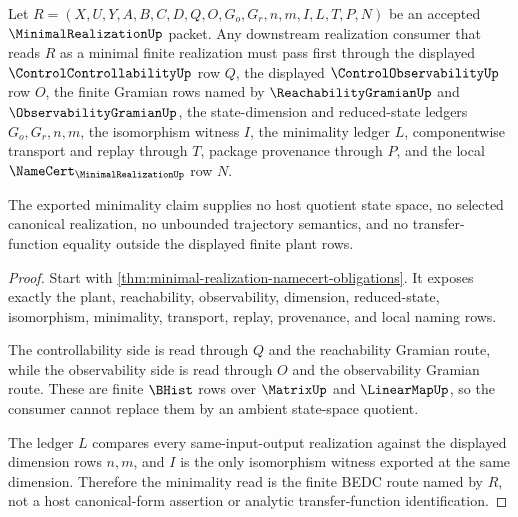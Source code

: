 \begin{theorem}
\label{thm:minimal-realization-controllability-observability-minimality}
Let $R=(X,U,Y,A,B,C,D,Q,O,G_o,G_r,n,m,I,L,T,P,N)$ be an accepted $\MinimalRealizationUp$ packet. Any downstream realization consumer that reads $R$ as a minimal finite realization must pass first through the displayed $\ControlControllabilityUp$ row $Q$, the displayed $\ControlObservabilityUp$ row $O$, the finite Gramian rows named by $\ReachabilityGramianUp$ and $\ObservabilityGramianUp$, the state-dimension and reduced-state ledgers $G_o,G_r,n,m$, the isomorphism witness $I$, the minimality ledger $L$, componentwise transport and replay through $T$, package provenance through $P$, and the local $\NameCert_{\MinimalRealizationUp}$ row $N$.

The exported minimality claim supplies no host quotient state space, no selected canonical realization, no unbounded trajectory semantics, and no transfer-function equality outside the displayed finite plant rows.
\end{theorem}
\begin{proof}
Start with \autoref{thm:minimal-realization-namecert-obligations}. It exposes exactly the plant, reachability, observability, dimension, reduced-state, isomorphism, minimality, transport, replay, provenance, and local naming rows.

The controllability side is read through $Q$ and the reachability Gramian route, while the observability side is read through $O$ and the observability Gramian route. These are finite $\BHist$ rows over $\MatrixUp$ and $\LinearMapUp$, so the consumer cannot replace them by an ambient state-space quotient.

The ledger $L$ compares every same-input-output realization against the displayed dimension rows $n,m$, and $I$ is the only isomorphism witness exported at the same dimension. Therefore the minimality read is the finite BEDC route named by $R$, not a host canonical-form assertion or analytic transfer-function identification.
\end{proof}



